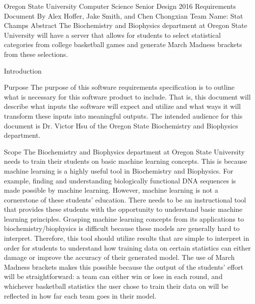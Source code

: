 \documentclass[letterpaper, 10pt,titlepage]{article}
\begin{document}
\begin{center}

Oregon State University Computer Science Senior Design 2016
\bigbreak
Requirements Document
\bigbreak
By Alex Hoffer, Jake Smith, and Chen Chongxian
\bigbreak
Team Name: Stat Champs
\bigbreak
\vspace{3.0cm}
 Abstract
\bigbreak
The Biochemistry and Biophysics department at Oregon State University will have a server that allows for students to select statistical categories from college basketball games and generate March Madness brackets from these selections.
\newpage
\end{center}

\tableofcontents

\newpage

\begin{section}{Introduction}


\begin{subsection}{Purpose}
The purpose of this software requirements specification is to outline what is necessary for this software product to include. That is, this document will describe what inputs the software will expect and utilize and what ways it will transform these inputs into meaningful outputs. The intended audience for this document is Dr. Victor Hsu of the Oregon State Biochemistry and Biophysics department.
\end{subsection}


\begin{subsection}{Scope}
The Biochemistry and Biophysics department at Oregon State University needs to train their students on basic machine learning concepts. This is because machine learning is a highly useful tool in Biochemistry and Biophysics. For example, finding and understanding biologically functional DNA sequences is made possible by machine learning. However, machine learning is not a cornerstone of these students’ education. There needs to be an instructional tool that provides these students with the opportunity to understand basic machine learning principles. Grasping machine learning concepts from its applications to biochemistry/biophysics is difficult because these models are generally hard to interpret. Therefore, this tool should utilize results that are simple to interpret in order for students to understand how training data on certain statistics can either damage or improve the accuracy of their generated model. The use of March Madness brackets makes this possible because the output of the students’ effort will be straightforward: a team can either win or lose in each round, and whichever basketball statistics the user chose to train their data on will be reflected in how far each team goes in their model.
\end{subsection}


\end{section}
\end{document}

